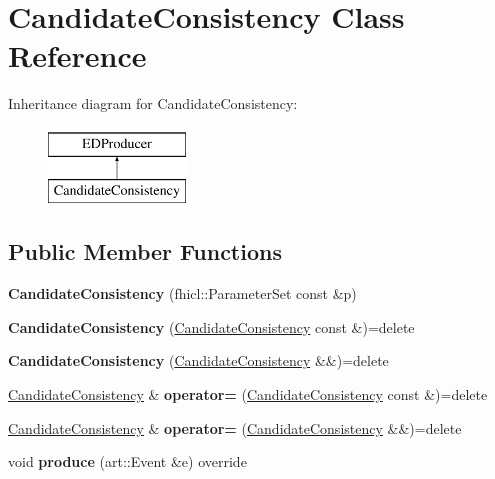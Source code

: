 \hypertarget{classCandidateConsistency}{\section{Candidate\-Consistency Class Reference}
\label{classCandidateConsistency}
}
Inheritance diagram for Candidate\-Consistency\-:\begin{figure}[H]
\begin{center}
\leavevmode
\includegraphics[height=2.000000cm]{classCandidateConsistency}
\end{center}
\end{figure}
\subsection*{Public Member Functions}
\begin{DoxyCompactItemize}
\item 
\hypertarget{classCandidateConsistency_a8595b5e59ad6eccc745ef72eadacb298}{{\bfseries Candidate\-Consistency} (fhicl\-::\-Parameter\-Set const \&p)}\label{classCandidateConsistency_a8595b5e59ad6eccc745ef72eadacb298}

\item 
\hypertarget{classCandidateConsistency_ad7c4725ac70e9816207c26c147958be3}{{\bfseries Candidate\-Consistency} (\hyperlink{classCandidateConsistency}{Candidate\-Consistency} const \&)=delete}\label{classCandidateConsistency_ad7c4725ac70e9816207c26c147958be3}

\item 
\hypertarget{classCandidateConsistency_a5eaaca57d9db53aabfca9af527b354fb}{{\bfseries Candidate\-Consistency} (\hyperlink{classCandidateConsistency}{Candidate\-Consistency} \&\&)=delete}\label{classCandidateConsistency_a5eaaca57d9db53aabfca9af527b354fb}

\item 
\hypertarget{classCandidateConsistency_a00a0461760b399b46cecd5538b58bab1}{\hyperlink{classCandidateConsistency}{Candidate\-Consistency} \& {\bfseries operator=} (\hyperlink{classCandidateConsistency}{Candidate\-Consistency} const \&)=delete}\label{classCandidateConsistency_a00a0461760b399b46cecd5538b58bab1}

\item 
\hypertarget{classCandidateConsistency_aada6a266ad99b5c1341f47e91c44980b}{\hyperlink{classCandidateConsistency}{Candidate\-Consistency} \& {\bfseries operator=} (\hyperlink{classCandidateConsistency}{Candidate\-Consistency} \&\&)=delete}\label{classCandidateConsistency_aada6a266ad99b5c1341f47e91c44980b}

\item 
\hypertarget{classCandidateConsistency_a40c3b73d21d17afbe1a77e28e2adef92}{void {\bfseries produce} (art\-::\-Event \&e) override}\label{classCandidateConsistency_a40c3b73d21d17afbe1a77e28e2adef92}

\end{DoxyCompactItemize}


